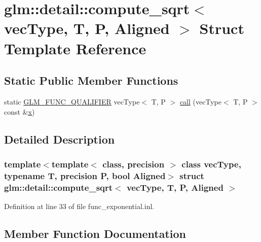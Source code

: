 \hypertarget{structglm_1_1detail_1_1compute__sqrt}{}\section{glm\+::detail\+::compute\+\_\+sqrt$<$ vec\+Type, T, P, Aligned $>$ Struct Template Reference}
\label{structglm_1_1detail_1_1compute__sqrt}
\subsection*{Static Public Member Functions}
\begin{DoxyCompactItemize}
\item 
static \mbox{\hyperlink{setup_8hpp_a33fdea6f91c5f834105f7415e2a64407}{G\+L\+M\+\_\+\+F\+U\+N\+C\+\_\+\+Q\+U\+A\+L\+I\+F\+I\+ER}} vec\+Type$<$ T, P $>$ \mbox{\hyperlink{structglm_1_1detail_1_1compute__sqrt_ae58351e6ea836486d1724511c9f5edd1}{call}} (vec\+Type$<$ T, P $>$ const \&\mbox{\hyperlink{glad_8h_a92d0386e5c19fb81ea88c9f99644ab1d}{x}})
\end{DoxyCompactItemize}


\subsection{Detailed Description}
\subsubsection*{template$<$template$<$ class, precision $>$ class vec\+Type, typename T, precision P, bool Aligned$>$\newline
struct glm\+::detail\+::compute\+\_\+sqrt$<$ vec\+Type, T, P, Aligned $>$}



Definition at line 33 of file func\+\_\+exponential.\+inl.



\subsection{Member Function Documentation}
\mbox{\label{structglm_1_1detail_1_1compute__sqrt_ae58351e6ea836486d1724511c9f5edd1}} 
